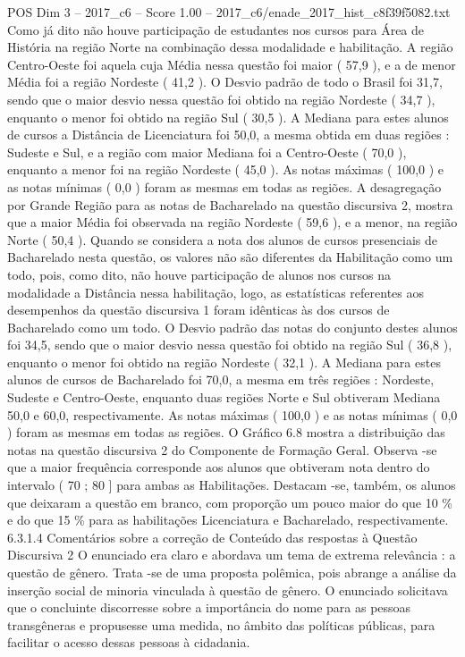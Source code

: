 \begin{textsample}{POS Dim 3 – 2017\_c6 – Score 1.00 – 2017\_c6/enade\_2017\_hist\_c8f39f5082.txt}
Como já dito não houve participação de estudantes nos cursos para Área de História na região Norte na combinação dessa modalidade e habilitação.
A região Centro-Oeste foi aquela cuja Média nessa questão foi maior ( 57,9 ), e a de menor Média foi a região Nordeste ( 41,2 ).
O Desvio padrão de todo o Brasil foi 31,7, sendo que o maior desvio nessa questão foi obtido na região Nordeste ( 34,7 ), enquanto o menor foi obtido na região Sul ( 30,5 ).
A Mediana para estes alunos de cursos a Distância de Licenciatura foi 50,0, a mesma obtida em duas regiões : Sudeste e Sul, e a região com maior Mediana foi a Centro-Oeste ( 70,0 ), enquanto a menor foi na região Nordeste ( 45,0 ).
As notas máximas ( 100,0 ) e as notas mínimas ( 0,0 ) foram as mesmas em todas as regiões.
A desagregação por Grande Região para as notas de Bacharelado na questão discursiva 2, mostra que a maior Média foi observada na região Nordeste ( 59,6 ), e a menor, na região Norte ( 50,4 ).
Quando se considera a nota dos alunos de cursos presenciais de Bacharelado nesta questão, os valores não são diferentes da Habilitação como um todo, pois, como dito, não houve participação de alunos nos cursos na modalidade a Distância nessa habilitação, logo, as estatísticas referentes aos desempenhos da questão discursiva 1 foram idênticas às dos cursos de Bacharelado como um todo.
O Desvio padrão das notas do conjunto destes alunos foi 34,5, sendo que o maior desvio nessa questão foi obtido na região Sul ( 36,8 ), enquanto o menor foi obtido na região Nordeste ( 32,1 ).
A Mediana para estes alunos de cursos de Bacharelado foi 70,0, a mesma em três regiões : Nordeste, Sudeste e Centro-Oeste, enquanto duas regiões Norte e Sul obtiveram Mediana 50,0 e 60,0, respectivamente.
As notas máximas ( 100,0 ) e as notas mínimas ( 0,0 ) foram as mesmas em todas as regiões.
O Gráfico 6.8 mostra a distribuição das notas na questão discursiva 2 do Componente de Formação Geral.
Observa -se que a maior frequência corresponde aos alunos que obtiveram nota dentro do intervalo ( 70 ; 80 ] para ambas as Habilitações.
Destacam -se, também, os alunos que deixaram a questão em branco, com proporção um pouco maior do que 10 \% e do que 15 \% para as habilitações Licenciatura e Bacharelado, respectivamente. 6.3.1.4 Comentários sobre a correção de Conteúdo das respostas à Questão Discursiva 2 O enunciado era claro e abordava um tema de extrema relevância : a questão de gênero.
Trata -se de uma proposta polêmica, pois abrange a análise da inserção social de minoria vinculada à questão de gênero.
O enunciado solicitava que o concluinte discorresse sobre a importância do nome para as pessoas transgêneras e propusesse uma medida, no âmbito das políticas públicas, para facilitar o acesso dessas pessoas à cidadania.

\end{textsample}
